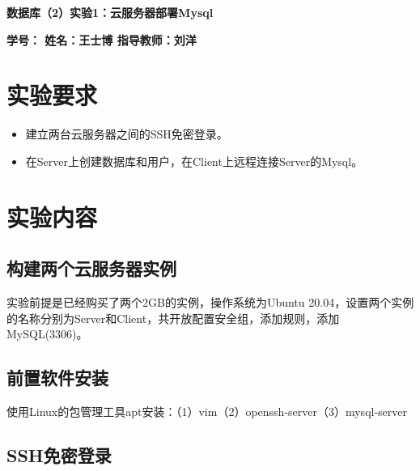 \documentclass{article}
\begin{document}
 
\begin{center}
    \textbf{\huge 数据库（2）实验1：云服务器部署Mysql}
\end{center}
\begin{center}
    \textbf{\large \textbf{学号： \quad 姓名：王士博 \quad 指导教师：刘洋}}
\end{center}
\hrulefill
\section{实验要求}
\begin{itemize}
  \item 建立两台云服务器之间的SSH免密登录。
  \item 在Server上创建数据库和用户，在Client上远程连接Server的Mysql。
\end{itemize}
\section{实验内容}
\subsection{构建两个云服务器实例}
实验前提是已经购买了两个2GB的实例，操作系统为Ubuntu 20.04，设置两个实例的名称分别为Server和Client，共开放配置安全组，添加规则，添加MySQL(3306)。
\subsection{前置软件安装}
\indent 使用Linux的包管理工具apt安装：（1）vim（2）openssh-server（3）mysql-server
\subsection{SSH免密登录}
\end{document}
